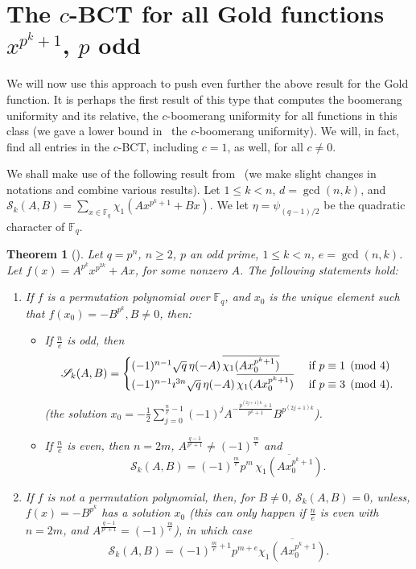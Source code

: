 \documentclass[11pt]{article}
\newtheorem{thm}{Theorem}
\def\F{{\mathbb F}}
\def\\{\cr}
\begin{document}
\section{The $c$-BCT for all Gold functions $x^{p^k+1}$, $p$ odd}
\label{sec4}
We will now use this approach to push  even further the above result for the Gold function. It is perhaps the first result of this type that computes the boomerang uniformity and its relative, the $c$-boomerang uniformity for all functions in this class (we gave a lower bound in~\cite{S20}
the $c$-boomerang uniformity). 
We will, in fact, find all entries in the $c$-BCT, including $c=1$, as well,  for all $c\neq 0$.

We shall make use of the following result from~\cite{Co98} (we make slight changes in notations and combine various results). Let $1\leq k<n$, $d=\gcd(n,k)$, and $\mathscr{S}_k(A,B)=\sum_{x\in \F_q} \chi_1\left(A x^{p^k+1}+ B x\right)$. We let $\eta=\psi_{(q-1)/2}$ be the quadratic character of $\F_q$.
\begin{thm}[\textup{\cite{Co98}}]
\label{thm:Co98}
Let $q=p^n$, $n\geq 2$, $p$ an  odd prime, $1\leq k<n$, $e=\gcd(n,k)$. Let $f(x)=A^{p^k} x^{p^{2k}}+Ax$, for some nonzero $A$. The following statements hold:
\begin{enumerate}
\item[$(1)$]
If $f$ is a permutation polynomial over $\F_q$, and  $x_0$ is the unique element such that $f(x_0)=-B^{p^k},B\neq 0$, then:
\begin{itemize}
\item[$(i)$] If $\frac{n}{e}$ is odd, then 
\[
\mathscr{S}_k(A,B)=
\begin{cases}
(-1)^{n-1} \sqrt{q}\,\eta(-A)\,\overline{\chi_1(Ax_0^{p^k+1})} &\text{ if } p\equiv 1\pmod 4\\
(-1)^{n-1} \imath^{3n} \sqrt{q}\,\eta(-A)\,\overline{\chi_1(Ax_0^{p^k+1})} &\text{ if } p\equiv 3\pmod 4.
\end{cases}
\]
(the solution $x_0=-\frac{1}{2}\sum_{j=0}^{\frac{n}{e}-1} (-1)^j A^{-\frac{p^{(2j+1)k}+1}{p^k+1}} B^{p^{(2j+1)k}}$).
\item[$(ii)$] If $\frac{n}{e}$ is even, then $n=2m$, $A^{\frac{q-1}{p^e+1}}\neq (-1)^{\frac{m}{e}}$ and
\[
\mathscr{S}_k(A,B)=(-1)^{\frac{m}{e}} p^m\, \overline{\chi_1(Ax_0^{p^k+1})}.
\]
\end{itemize}
\item[$(2)$] If $f$ is not a permutation polynomial, then, for $B\neq 0$, $\mathscr{S}_k(A,B)=0$, unless, $f(x)=-B^{p^k}$ has a solution $x_0$ (this can only happen if $\frac{n}{e}$ is even with $n = 2m$, and $A^{\frac{q-1}{p^e+1}}= (-1)^{\frac{m}{e}}$), in which case
\[
\mathscr{S}_k(A,B)=(-1)^{\frac{m}{e}+1}p^{m+e} \overline{\chi_1(Ax_0^{p^k+1})}.
\]
\end{enumerate}
\end{thm}
\end{document}
